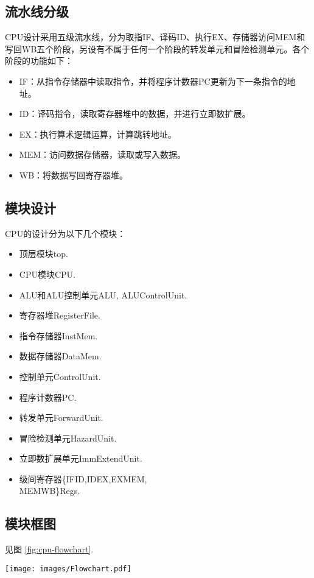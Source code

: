 \subsection{流水线分级}
CPU设计采用五级流水线，分为取指IF、译码ID、执行EX、存储器访问MEM和写回WB五个阶段，另设有不属于任何一个阶段的转发单元和冒险检测单元。各个阶段的功能如下：
\begin{itemize}
    \item IF：从指令存储器中读取指令，并将程序计数器PC更新为下一条指令的地址。
    \item ID：译码指令，读取寄存器堆中的数据，并进行立即数扩展。
    \item EX：执行算术逻辑运算，计算跳转地址。
    \item MEM：访问数据存储器，读取或写入数据。
    \item WB：将数据写回寄存器堆。
\end{itemize}

\subsection{模块设计}
CPU的设计分为以下几个模块：
\begin{itemize}
    \item 顶层模块top.
    \item CPU模块CPU.
    \item ALU和ALU控制单元ALU, ALUControlUnit.
    \item 寄存器堆RegisterFile.
    \item 指令存储器InstMem.
    \item 数据存储器DataMem.
    \item 控制单元ControlUnit.
    \item 程序计数器PC.
    \item 转发单元ForwardUnit.
    \item 冒险检测单元HazardUnit.
    \item 立即数扩展单元ImmExtendUnit.
    \item 级间寄存器\{IFID,IDEX,EXMEM,\\MEMWB\}Regs.
\end{itemize}
    
\subsection{模块框图}
见图 \ref{fig:cpu-flowchart}.

\begin{figure*}[ht]
    \centering
    \texttt{[image: images/Flowchart.pdf]}
    \caption{CPU模块框图}
    \label{fig:cpu-flowchart}
\end{figure*}

